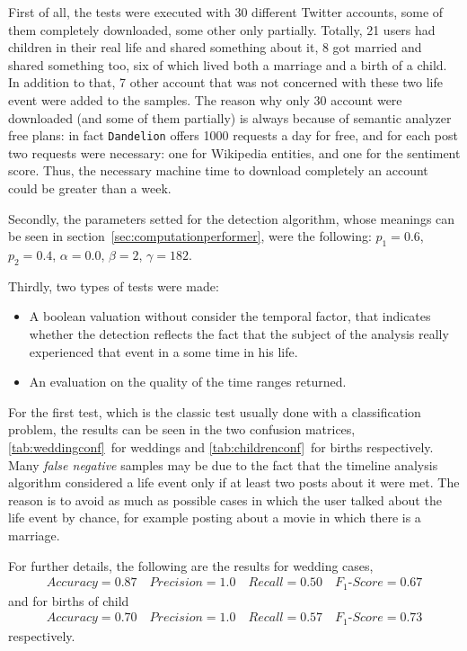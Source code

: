 First of all, the tests were executed with 30 different Twitter accounts, some of them completely downloaded, some other only partially. Totally, 21 users had children in their real life and shared something about it, 8 got married and shared something too, six of which lived both a marriage and a birth of a child. In addition to that, 7 other account that was not concerned with these two life event were added to the samples. The reason why only 30 account were downloaded (and some of them partially) is always because of semantic analyzer free plans: in fact \texttt{Dandelion} offers 1000 requests a day for free, and for each post two requests were necessary: one for Wikipedia entities, and one for the sentiment score. Thus, the necessary machine time to download completely an account could be greater than a week.

Secondly, the parameters setted for the detection algorithm, whose meanings can be seen in section~\ref{sec:computationperformer}, were the following: $p_1 = 0.6$, $p_2 = 0.4$, $\alpha = 0.0$, $ \beta = 2$, $ \gamma = 182$.

Thirdly, two types of tests were made:
\begin{itemize}
\item A boolean valuation without consider the temporal factor, that indicates whether the detection reflects the fact that the subject of the analysis really experienced that event in a some time in his life.
\item An evaluation on the quality of the time ranges returned.
\end{itemize}
For the first test, which is the classic test usually done with a classification problem, the results can be seen in the two confusion matrices, \ref{tab:weddingconf}~for weddings and \ref{tab:childrenconf}~for births respectively. Many \emph{false negative} samples may be due to the fact that the timeline analysis algorithm considered a life event only if at least two posts about it were met. The reason is to avoid as much as possible cases in which the user talked about the life event by chance, for example posting about a movie in which there is a marriage.

For further details, the following are the results for wedding cases,
\begin{gather}
Accuracy = 0.87 \quad Precision = 1.0 \quad Recall = 0.50 \quad F_1\text{-}Score = 0.67
\label{weddingconfdata}
\end{gather}
and for births of child
\begin{gather}
Accuracy = 0.70 \quad Precision = 1.0 \quad Recall = 0.57 \quad F_1\text{-}Score = 0.73
\label{childrenconfdata}
\end{gather}
respectively.

